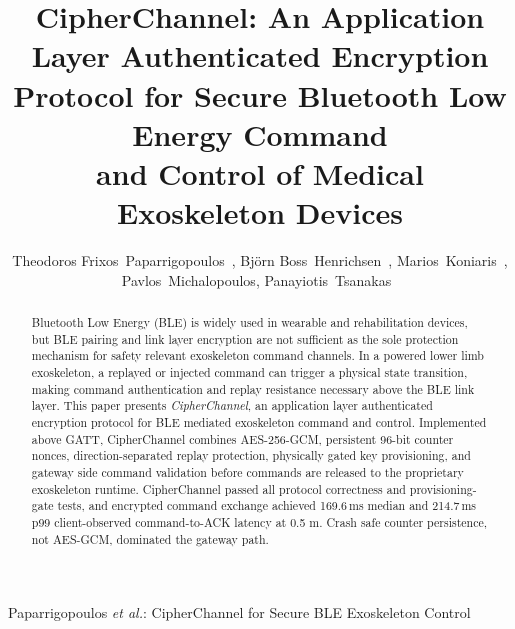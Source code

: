 \documentclass[journal]{IEEEtran}
\newcommand{\TODO}[1]{\textcolor{red}{\textbf{[TODO: #1]}}}
\begin{document}


\title{CipherChannel: An Application Layer Authenticated Encryption\\
Protocol for Secure Bluetooth Low Energy Command\\
and Control of Medical Exoskeleton Devices}

\author{
  Theodoros Frixos~Paparrigopoulos~,
  Björn Boss~Henrichsen~,
  Marios~Koniaris~,
  Pavlos~Michalopoulos,
  Panayiotis~Tsanakas~%


}

%
{Paparrigopoulos \MakeLowercase{\textit{et al.}}: CipherChannel for Secure BLE Exoskeleton Control}

\maketitle

\begin{abstract}
Bluetooth Low Energy (BLE) is widely used in wearable and rehabilitation devices, but BLE pairing and link layer encryption are not sufficient as the sole protection mechanism for safety relevant exoskeleton command channels. In a powered lower limb exoskeleton, a replayed or injected command can trigger a physical state transition, making command authentication and replay resistance necessary above the BLE link layer.
This paper presents \emph{CipherChannel}, an application layer authenticated encryption protocol for BLE mediated exoskeleton command and control. Implemented above GATT, CipherChannel combines AES-256-GCM, persistent 96-bit counter nonces, direction-separated replay protection, physically gated key provisioning, and gateway side command validation before commands are released to the proprietary exoskeleton runtime.
CipherChannel passed all protocol correctness and provisioning-gate tests, and encrypted command exchange achieved 169.6\,ms median and 214.7\,ms p99 client-observed command-to-ACK latency at 0.5 m. Crash safe counter persistence, not AES-GCM, dominated the gateway path.
\end{abstract}
\end{document}
